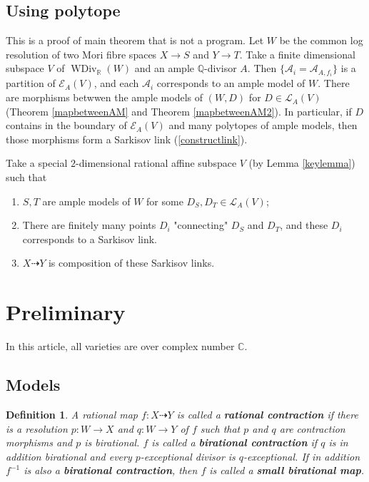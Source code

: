 \documentclass{article}
\newtheorem{defn}{Definition}[subsection]
\begin{document}
\subsection{Using polytope}
This is a proof of main theorem that is not a program. Let $W$ be the common log resolution of two Mori fibre spaces $X\to S$ and $Y\to T$. Take a finite dimensional subspace $V$ of $\operatorname{WDiv}_{\mathbb{R}}(W)$ and an ample $\mathbb{Q}$-divisor $A$. Then $\{\mathcal{A}_{i} =\mathcal{A}_{A,f_{i}}\} $ is a partition of $\mathcal{E}_{A}(V)$, and each $\mathcal{A}_{i}$ corresponds to an ample model of $W$. There are morphisms betwwen the ample models of $(W,D)$ for $D \in \mathcal{L}_{A}(V)$ (Theorem \ref{mapbetweenAM} and Theorem \ref{mapbetweenAM2}). In particular, if $D$ contains in the boundary of  $\mathcal{E}_{A}(V)$ and many polytopes of ample models, then those morphisms form a Sarkisov link (\ref{constructlink}).

Take a special $2$-dimensional rational affine subspace  $V$ (by Lemma \ref{keylemma}) such that 
\begin{enumerate}
  \item $S,T$ are ample models of $W$ for some $D_{S},D_{T} \in \mathcal{L}_{A}(V)$;
  \item  There are finitely many points  $D_{i}$ "connecting" $D_{S}$ and $D_{T}$, and these $D_{i}$ corresponds to a Sarkisov link.
  \item   $X\dashrightarrow Y$ is composition of these Sarkisov links.
\end{enumerate}

\section{Preliminary}
In this article, all varieties are over complex number $\mathbb{C}$.
\subsection{Models}
\begin{defn}
  \cite[2.Notation and Conventions]{haconSarkisovProgram2012} A rational map $f:X\dashrightarrow Y$ is called a \textbf{rational contraction} if there is a resolution $p:W\to X$  and $q:W\to Y$  of $f$  such that $p$  and $q$  are contraction morphisms and $p$  is birational. $f$ is called a \textbf{birational contraction} if $q$  is in addition birational and every $p$-exceptional divisor is $q$-exceptional. If in addition $f^{-1}$ is also a \textbf{birational contraction}, then $f$ is called a \textbf{small birational map}.
\end{defn}
\end{document}
